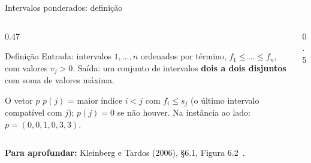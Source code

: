 \documentclass[aspectratio=169,xcolor=table]{beamer}
\newcommand{\intervalo}[5]{%
  \draw[line width=2.4mm, #5] (#2,-#1*0.42) -- (#3,-#1*0.42);
  \node[font=\tiny, anchor=west] at (#3+0.1,-#1*0.42) {#4};%
}
\newcommand{\fonte}[1]{%
  \vfill
  {\tiny\color{gray!55!black}\textbf{Para aprofundar:} #1\par}%
}
\begin{document}
\begin{frame}{Intervalos ponderados: definição}
  \begin{columns}[c]
    \begin{column}{0.47\textwidth}
      \begin{block}{Definição}
        \scriptsize Entrada: intervalos $1,\dots,n$ ordenados por término,
        $f_1 \le \dots \le f_n$, com valores $v_j > 0$. Saída: um conjunto de intervalos
        \textbf{dois a dois disjuntos} com soma de valores máxima.
      \end{block}
      \begin{exampleblock}{O vetor $p$}
        \scriptsize $p(j)$ = maior índice $i < j$ com $f_i \le s_j$ (o último intervalo
        compatível com $j$); $p(j)=0$ se não houver.
        Na instância ao lado: $p = (0,0,1,0,3,3)$.
      \end{exampleblock}
    \end{column}
    \begin{column}{0.5\textwidth}
      \centering
    \end{column}
  \end{columns}
  \fonte{Kleinberg e Tardos (2006), \S 6.1, Figura 6.2~\cite{kleinberg2006algorithm}.}
\end{frame}
\end{document}
